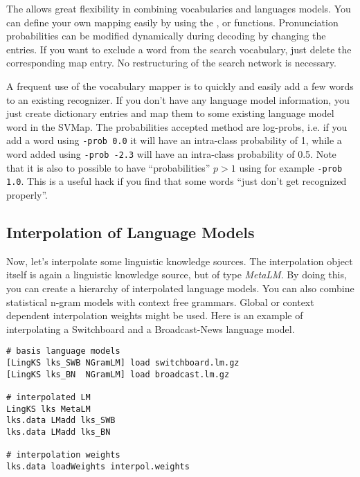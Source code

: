 The    allows   great   flexibility  in  combining
vocabularies and  languages  models. You  can  define your own mapping
easily  by    using  the  ,    or
  functions.  Pronunciation probabilities can
be   modified dynamically    during     decoding by   changing     the
 entries.  If you want  to exclude a word from the
search   vocabulary,  just delete the    corresponding map  entry.  No
restructuring of the search network is necessary.

A frequent use of the vocabulary mapper is to quickly and easily add a
few  words to an  existing recognizer. If you  don't have any language
model information, you just create dictionary  entries and map them to
some  existing  language model  word in  the SVMap.  The probabilities
accepted   method  are  log-probs, i.e. if  you add a
word using \texttt{-prob 0.0} it  will have an intra-class probability
of 1, while   a word added  using   \texttt{-prob -2.3} will  have  an
intra-class probability  of 0.5. Note  that it is  also to possible to
have   ``probabilities'' $p  >  1$   using  for example  \texttt{-prob
1.0}. This is a  useful hack if you  find that some words ``just don't
get recognized properly''.


\subsection{Interpolation of Language Models}

Now,     let's interpolate  some   linguistic  knowledge  sources. The
interpolation object itself  is  again a linguistic  knowledge source,
but of type {\em MetaLM}. By doing this, you  can create a hierarchy
of interpolated  language  models. You  can  also combine  statistical
n-gram  models with context free  grammars. Global or context dependent
interpolation  weights   might    be used.   Here is    an  example of
interpolating a Switchboard and a Broadcast-News language model.

\begin{verbatim}
# basis language models
[LingKS lks_SWB NGramLM] load switchboard.lm.gz
[LingKS lks_BN  NGramLM] load broadcast.lm.gz

# interpolated LM
LingKS lks MetaLM
lks.data LMadd lks_SWB
lks.data LMadd lks_BN

# interpolation weights
lks.data loadWeights interpol.weights
\end{verbatim}

